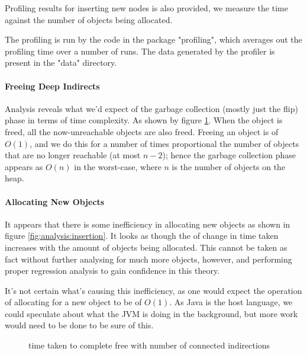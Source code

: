 \documentclass[]{article}
\begin{document}
Profiling results for inserting new nodes is also provided, we measure the time against the number of objects being allocated.

The profiling is run by the code in the package "profiling", which averages out the profiling time over a number of runs. The data generated by the profiler is present in the "data" directory.

\paragraph{Freeing Deep Indirects}
Analysis reveals what we'd expect of the garbage collection (mostly just the flip) phase in terms of time complexity. As shown by figure \ref{fig:analysis:indirect}. When the object is freed, all the now-unreachable objects are also freed. Freeing an object is of $O(1)$, and we do this for a number of times proportional the number of objects that are no longer reachable (at most $n - 2$); hence the garbage collection phase appears as $O(n)$ in the worst-case, where $n$ is the number of objects on the heap.

\paragraph{Allocating New Objects}
It appears that there is some inefficiency in allocating new objects as shown in figure \ref{fig:analysis:insertion}. It looks as though the of change in time taken increases with the amount of objects being allocated. This cannot be taken as fact without further analysing for much more objects, however, and performing proper regression analysis to gain confidence in this theory.

It's not certain what's causing this inefficiency, as one would expect the operation of allocating for a new object to be of $O(1)$. As Java is the host language, we could speculate about what the JVM is doing in the background, but more work would need to be done to be sure of this.

\begin{figure}[!htbp]
	\begin{center}
		\caption{time taken to complete free with number of connected indirections\label{fig:analysis:indirect}}
	\end{center}
\end{figure}
\end{document}

